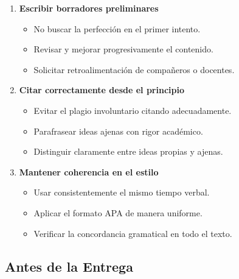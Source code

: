 \documentclass[12pt,a4paper]{article}
\begin{document}
\begin{enumerate}
  \item \textbf{Escribir borradores preliminares}
  \begin{itemize}
    \item No buscar la perfección en el primer intento.
    \item Revisar y mejorar progresivamente el contenido.
    \item Solicitar retroalimentación de compañeros o docentes.
  \end{itemize}
  
  \item \textbf{Citar correctamente desde el principio}
  \begin{itemize}
    \item Evitar el plagio involuntario citando adecuadamente.
    \item Parafrasear ideas ajenas con rigor académico.
    \item Distinguir claramente entre ideas propias y ajenas.
  \end{itemize}
  
  \item \textbf{Mantener coherencia en el estilo}
  \begin{itemize}
    \item Usar consistentemente el mismo tiempo verbal.
    \item Aplicar el formato APA de manera uniforme.
    \item Verificar la concordancia gramatical en todo el texto.
  \end{itemize}
\end{enumerate}

\subsection{Antes de la Entrega}
\end{document}
